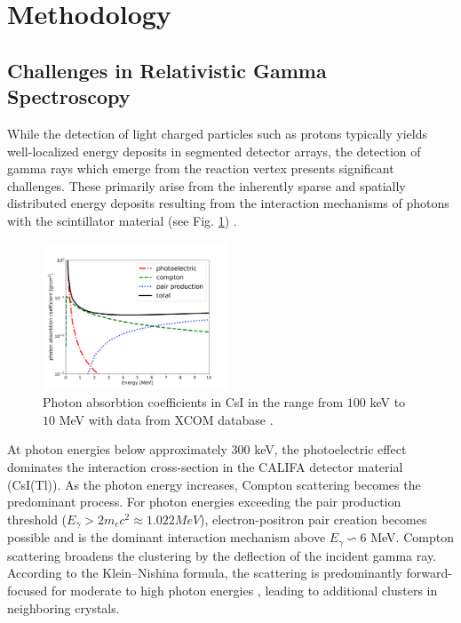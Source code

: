 \documentclass[final,5p,times,twocolumn]{elsarticle}
\begin{document}
\section{Methodology}
\label{sec:metho}
\subsection{Challenges in Relativistic Gamma Spectroscopy}\label{s_sec:gamma_spec}
While the detection of light charged particles such as protons typically yields well-localized energy deposits in segmented detector arrays, the detection of gamma rays which emerge from the reaction vertex presents significant challenges. These primarily arise from the inherently sparse and spatially distributed energy deposits resulting from the interaction mechanisms of photons with the scintillator material (see Fig. \ref{fig:csi}) \cite{kolanoski2016teilchendetektoren}.\newline
\begin{figure}[!htb]
	\centering 
	\includegraphics[width=0.49\textwidth]{csi_attuenuation.png}	
	\caption{Photon absorbtion coefficients in CsI in the range from $100$ keV to $10$ MeV with data from XCOM database \cite{seltzer2010xcom}.} 
	\label{fig:csi}%
\end{figure}
At photon energies below approximately $300$ keV, the photoelectric effect dominates the interaction cross-section in the CALIFA detector material (CsI(Tl)). As the photon energy increases, Compton scattering becomes the predominant process. For photon energies exceeding the pair production threshold ($E_{\gamma} > 2m_{e}c^2 \approx 1.022 MeV$), electron-positron pair creation becomes possible and is the dominant interaction mechanism above $E_{\gamma} \backsim 6$ MeV.\newline
Compton scattering broadens the clustering by the deflection of the incident gamma ray. According to the Klein–Nishina formula, the scattering is predominantly forward-focused for moderate to high photon energies \cite{klein1929streuung}, leading to additional clusters in neighboring crystals.\newline
\end{document}
